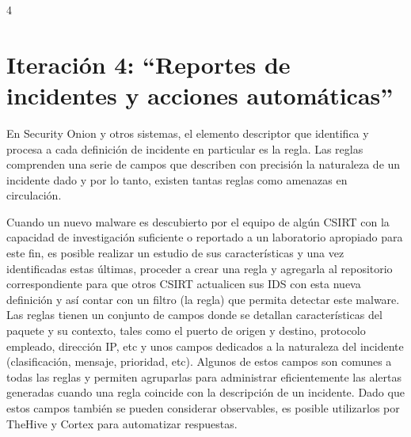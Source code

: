 4\chapter{Iteración 4: “Reportes de incidentes y acciones automáticas”}
    En Security Onion y otros sistemas, el elemento descriptor que identifica y procesa a cada definición de incidente en particular es la regla. Las reglas comprenden una serie de campos que describen con precisión la naturaleza de un incidente dado y por lo tanto, existen tantas reglas como amenazas en circulación. \par
    Cuando un nuevo malware es descubierto por el equipo de algún CSIRT con la capacidad de investigación suficiente o reportado a un laboratorio apropiado para este fin, es posible realizar un estudio de sus características y una vez identificadas estas últimas, proceder a crear una regla y agregarla al repositorio correspondiente para que otros CSIRT actualicen sus IDS con esta nueva definición y así contar con un filtro (la regla) que permita detectar este malware. Las reglas tienen un conjunto de campos donde se detallan características del paquete y su contexto, tales como el puerto de origen y destino, protocolo empleado, dirección IP, etc y unos campos dedicados a la naturaleza del incidente (clasificación, mensaje, prioridad, etc). Algunos de estos campos son comunes a todas las reglas y permiten agruparlas para administrar eficientemente las alertas generadas cuando una regla coincide con la descripción de un incidente. Dado que estos campos también se pueden considerar observables, es posible utilizarlos por TheHive y Cortex para automatizar respuestas. \par

